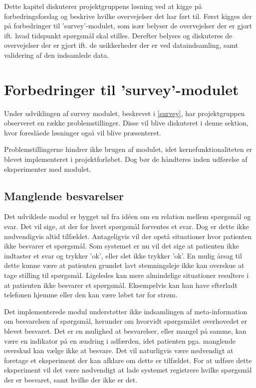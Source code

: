 \label{refleksion}
Dette kapitel diskuterer projektgruppens løsning ved at kigge på forbedringsforslag og beskrive hvilke overvejelser det har ført til.
Først kigges der på forbedringer til 'survey'-modulet, som især belyser de overvejelser der er gjort ift. hvad tidspunkt spørgsmål skal stilles.
Derefter belyses og diskuteres de overvejelser der er gjort ift. de usikkerheder der er ved dataindsamling, samt validering af den indsamlede data.

\section{Forbedringer til 'survey'-modulet}
Under udviklingen af survey modulet, beskrevet i \cref{survey}, har projektgruppen observeret en række problemstillinger.
Disse vil blive diskuteret i denne sektion, hvor foreslåede løsninger også vil blive præsenteret.

Problemstillingerne hindrer ikke brugen af modulet, idet kernefunktionaliteten er blevet implementeret i projektforløbet.
Dog bør de håndteres inden udførelse af eksperimenter med modulet.

\subsection{Manglende besvarelser}\label{reflection:manglende}
Det udviklede modul er bygget ud fra idéen om en relation mellem spørgsmål og svar.
Det vil sige, at der for hvert spørgsmål forventes et svar.
Dog er dette ikke nødvendigvis altid tilfældet.
Antageligvis vil der opstå situationer hvor patienten ikke besvarer et spørgsmål.
Som systemet er nu vil det sige at patienten ikke indtaster et svar og trykker 'ok', eller slet ikke trykker 'ok'.
En mulig årsag til dette kunne være at patienten grundet lavt stemningsleje ikke kan overskue at tage stilling til spørgsmål.
Ligeledes kan mere almindelige situationer resultere i at patienten ikke besvarer et spørgsmål.
Eksempelvis kan han have efterladt telefonen hjemme eller den kan være løbet tør for strøm.

Det implementerede modul understøtter ikke indsamlingen af meta-information om besvarelsen af spørgsmål, herunder om hvorvidt spørgsmålet overhovedet er blevet besvaret.
Det er en mulighed at besvarelser, eller mangel på samme, kan være en indikator på en ændring i adfærden, idet patienten pga. manglende overskud kan vælge ikke at besvare.
Det vil naturligvis være nødvendigt at foretage et eksperiment der kan afklare om dette er tilfældet.
For at udføre dette eksperiment vil det være nødvendigt at lade systemet registrere hvilke spørgsmål der er besvaret, samt hvilke der ikke er det.

